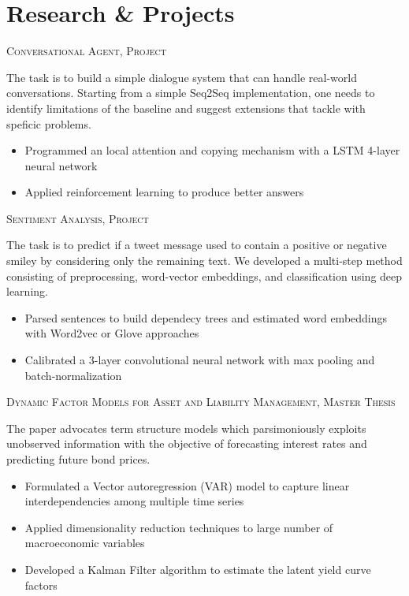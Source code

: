 \documentclass[11pt,a4paper,sans]{moderncv}
\begin{document}
\section{\LARGE{Research \& Projects}}
\vspace{2mm}
\cventry{}
	{\vspace{-0.4cm}}
	{\textsc{Conversational Agent, Project}}{}{}
	{
	The task is to build a simple dialogue system that can handle real-world conversations. Starting from a simple Seq2Seq implementation, one needs to identify limitations of the baseline and suggest extensions that tackle with speficic problems. 
	\vspace{1mm}
	\begin{itemize}
		\item Programmed an local attention and copying mechanism with a LSTM 4-layer neural network
		\item Applied reinforcement learning to produce better answers
		\vspace{2mm}	
	\end{itemize}
	}
\cventry{}
	{\vspace{-0.4cm}}
	{\textsc{Sentiment Analysis, Project}}{}{}
	{
	The task is to predict if a tweet message used to contain a positive or negative smiley by considering only the remaining text. We developed a multi-step method consisting of preprocessing, word-vector embeddings, and classification using deep learning. 
	\vspace{1mm}
	\begin{itemize}
		\item Parsed sentences to build dependecy trees and estimated word embeddings with Word2vec or Glove approaches
		\item Calibrated a 3-layer convolutional neural network with max pooling and batch-normalization
		\vspace{2mm}	
	\end{itemize}
	}
\cventry{}
	{\vspace{-0.4cm}}
	{\textsc{Dynamic Factor Models for Asset and Liability Management, Master Thesis}}{}{}
	{
	The paper advocates term structure models which parsimoniously exploits  unobserved information with the objective of forecasting interest rates and predicting future bond prices.	
	\vspace{1mm}
	\begin{itemize}
		\item Formulated a Vector autoregression (VAR) model to capture linear interdependencies among multiple time series
		\item Applied dimensionality reduction techniques to large number of macroeconomic variables
		\item Developed a Kalman Filter algorithm to estimate the latent yield curve factors	
		\vspace{2mm}	
	\end{itemize}
	}
\end{document}
